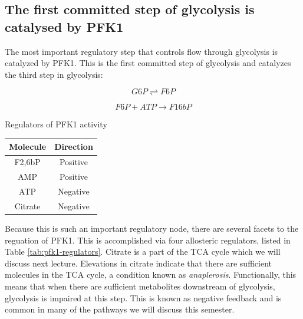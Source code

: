 \documentclass{tufte-handout}
\begin{document}
\subsection{The first committed step of glycolysis is catalysed by PFK1}

The most important regulatory step that controls flow through glycolysis is catalyzed by PFK1.  This is the first committed step of glycolysis and catalyzes the third step in glycolysis:

\begin{equation}\label{eq:pgm}
G6P \rightleftharpoons F6P
\end{equation}

\begin{equation}\label{eq:pfk1}
F6P + ATP \rightarrow F16bP
\end{equation}

\begin{margintable}
\centering
\caption{Regulators of PFK1 activity}
\label{tab:pfk1-regulators}
\begin{tabular}{cc}
\hline
\textbf {Molecule} & \textbf{Direction}  \\
\hline
F2,6bP & Positive \\
AMP & Positive \\
ATP & Negative \\
Citrate & Negative \\
\hline
\end{tabular}
\end{margintable}

Because this is such an important regulatory node, there are several facets to the reguation of PFK1.  This is accomplished via four allosteric regulators, listed in Table \ref{tab:pfk1-regulators}.  Citrate is a part of the TCA cycle which we will discuss next lecture.  Elevations in citrate indicate that there are sufficient molecules in the TCA cycle, a condition known as \emph{anaplerosis}.  Functionally, this means that when there are sufficient metabolites downstream of glycolysis, glycolysis is impaired at this step.  This is known as negative feedback and is common in many of the pathways we will discuss this semester.
\end{document}
